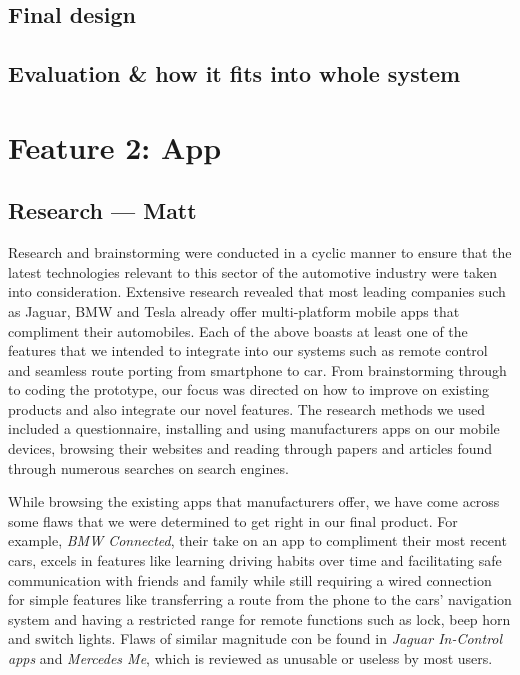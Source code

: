 \documentclass{article}
\begin{document}
\subsection{Final design}\label{ssec:nav-final-design}

\subsection{Evaluation \& how it fits into whole system}\label{ssec:nav-evaluation}


%
%
\section{Feature 2: App}\label{sec:app}

\subsection{Research --- Matt}\label{ssec:app-research}
Research and brainstorming were conducted in a cyclic manner to ensure that the latest technologies relevant to this sector of the automotive industry were taken into consideration. Extensive research revealed that most leading companies such as Jaguar, BMW and Tesla already offer multi-platform mobile apps that compliment their automobiles. Each of the above boasts at least one of the features that we intended to integrate into our systems such as remote control and seamless route porting from smartphone to car. From brainstorming through to coding the prototype, our focus was directed on how to improve on existing products and also integrate our novel features.
The research methods we used included a questionnaire, installing and using manufacturers apps on our mobile devices, browsing their websites and reading through papers and articles found through numerous searches on search engines. 

While browsing the existing apps that manufacturers offer, we have come across some flaws that  we were determined to get right in our final product. For example, \textit{BMW Connected}, their take on an app to compliment their most recent cars, excels in features like learning driving habits over time and facilitating safe communication with friends and family while still requiring a wired connection for simple features like transferring a route from the phone to the cars' navigation system and having a restricted range for remote functions such as lock, beep horn and switch lights. Flaws of similar magnitude con be found in \textit{Jaguar In-Control apps} and \textit{Mercedes Me}, which is reviewed as unusable or useless by most users.
\end{document}
